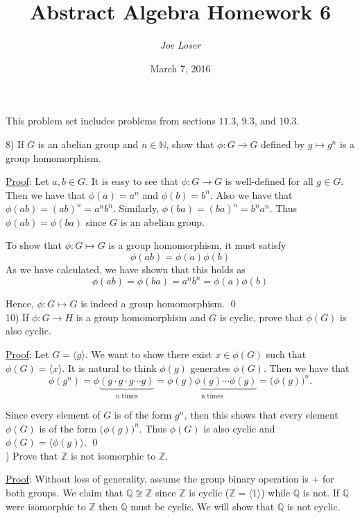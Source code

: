 \documentclass{article}
\title{Abstract Algebra Homework 6}
\author{\textit{Joe Loser}}
\date{March 7, 2016}
\begin{document}
\maketitle

This problem set includes problems from sections $11.3$, $9.3$, and $10.3$.

8) If $G$ is an abelian group and $n \in \mathbb{N}$, show that $\phi : G \to G$ defined by $g \mapsto g^{n}$ is a group homomorphism. 

\underline{Proof}: Let $a, b \in G$. It is easy to see that $\phi : G \to G$ is well-defined for all $g \in G$. Then we have that $\phi(a) = a^n$ and $\phi(b) = b^n$. Also we have that $\phi(ab) = (ab)^{n} = a^{n}b^{n}$. Similarly, $\phi(ba) = (ba)^{n} = b^{n}a^{n}$. Thus $\phi(ab) = \phi(ba)$ since $G$ is an abelian group. 

To show that $\phi : G \mapsto G$ is a group homomorphism, it must satisfy
$$\phi(ab) = \phi(a)\phi(b)$$
As we have calculated, we have shown that this holds as
$$\phi(ab) = \phi(ba) = a^{n}b^{n} = \phi(a)\phi(b) $$

Hence, $\phi : G \mapsto G$ is indeed a group homomorphism. \qed \\

10) If $\phi : G \to H$ is a group homomorphism and $G$ is cyclic, prove that $\phi(G)$ is also cyclic.

\underline{Proof}: Let $G = \langle g \rangle$. We want to show there exist $x \in \phi(G)$ such that $\phi(G) = \langle x \rangle$. It is natural to think $\phi(g)$ generates $\phi(G)$. Then we have that
$$\phi(g^n) = \phi\underbrace{(g \cdot g \cdot g \cdots g)}_{\text{n times}} = \underbrace{\phi(g)\phi(g) \cdots \phi(g)}_{\text{n times}} = \big(\phi(g)\big)^n.$$

Since every element of $G$ is of the form $g^{n}$, then this shows that every element $\phi(G)$ is of the form $\big(\phi(g)\big)^n$. Thus $\phi(G)$ is also cyclic and $\phi(G) = \langle \phi(g) \rangle$. \qed \\

) Prove that $\mathbb{Z}$ is not isomorphic to $\mathbb{Z}$. 

\underline{Proof}: Without loss of generality, assume the group binary operation is $+$ for both groups. We claim that $\mathbb{Q} \not \cong \mathbb{Z}$  since $\mathbb{Z}$ is cyclic ($\mathbb{Z} = \langle 1 \rangle$) while $\mathbb{Q}$ is not. If $\mathbb{Q}$ were isomorphic to $\mathbb{Z}$ then $\mathbb{Q}$ must be cyclic. We will show that $\mathbb{Q}$ is not cyclic. 
\end{document}
